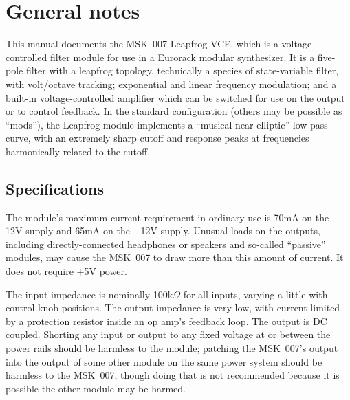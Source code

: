 
%
%
%
%
%
%

\chapter{General notes}

This manual documents the MSK~007 Leapfrog VCF, which is a
voltage-controlled filter module for use in a Eurorack modular synthesizer. 
It is a five-pole filter with a leapfrog topology, technically a species of
state-variable filter, with volt/octave tracking; exponential and linear
frequency modulation; and a built-in voltage-controlled amplifier which can
be switched for use on the output or to control feedback.  In
the standard configuration (others may be possible as ``mods''), the
Leapfrog module implements a ``musical near-elliptic'' low-pass curve, with
an extremely sharp cutoff and response peaks at frequencies harmonically
related to the cutoff.

\section{Specifications}

The module's maximum current requirement in ordinary use is 70mA on the
$+$12V supply and 65mA on the $-$12V supply.
Unusual loads on the outputs, including directly-connected headphones or
speakers and so-called ``passive'' modules, may cause the MSK~007 to draw
more than this amount of current.
It does not require $+$5V power.

The input impedance is nominally 100k$\Omega$ for all inputs, varying a
little with control knob positions.  The output impedance is very low, with
current limited by a protection resistor inside an op amp's feedback loop. 
The output is DC coupled.  Shorting any input or output to any fixed voltage
at or between the power rails should be harmless to the module; patching the
MSK~007's output into the output of some other module on the same power
system should be harmless to the MSK~007, though doing that is not
recommended because it is possible the other module may be harmed.

